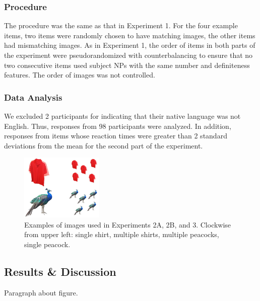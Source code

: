 \documentclass[10pt,letterpaper]{article}
\begin{document}
\subsubsection{Procedure} \quad The procedure was the same as that in Experiment 1. For the four example items, two items were randomly chosen to have matching images, the other items had mismatching images. As in Experiment 1, the order of items in both parts of the experiment were pseudorandomized with counterbalancing to ensure that no two consecutive items used subject NPs with the same number and definiteness features. The order of images was not controlled.

\subsubsection{Data Analysis} \quad We excluded 2 participants for indicating that their native language was not English. Thus, responses from 98 participants were analyzed. In addition, responses from items whose reaction times were greater than 2 standard deviations from the mean for the second part of the experiment.

\begin{figure}[t]
\begin{center}
\includegraphics[width=0.35\textwidth]{stimuli.jpg}
\end{center}
\caption{Examples of images used in Experiments 2A, 2B, and 3. Clockwise from upper left: single shirt, multiple shirts, multiple peacocks, single peacock.} 
\label{sample-figure}
\end{figure}

\subsection{Results \& Discussion}

Paragraph about figure.
\end{document}
